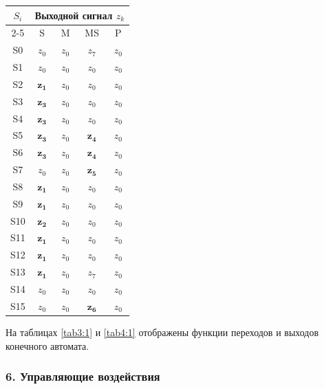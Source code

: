 \documentclass[11pt,a4paper,final]{article}
\begin{document}
	\begin{center}
		\label{tab4:1}
		\small
			\begin{tabular}{|c|c|c|c|c|}
			\hline
			\multirow{2}{*}{\( S_i \)} & \multicolumn{4}{c|}{Выходной сигнал \( z_k \)} \\
			\cline{2-5}
			& S & M & MS & P \\
			\hline
			S0 & \(z_0\) & \(z_0\) & \(z_7\) & \(z_0\) \\
			S1 & \(z_0\) & \(z_0\) & \(z_0\) & \(z_0\) \\
			S2 & \(\mathbf{z_1}\) & \(z_0\) & \(z_0\) & \(z_0\) \\
			S3 & \(\mathbf{z_3}\) & \(z_0\) & \(z_0\) & \(z_0\) \\
			S4 & \(\mathbf{z_3}\) & \(z_0\) & \(z_0\) & \(z_0\) \\
			S5 & \(\mathbf{z_3}\) & \(z_0\) & \(\mathbf{z_4}\) & \(z_0\) \\
			S6 & \(\mathbf{z_3}\) & \(z_0\) & \(\mathbf{z_4}\) & \(z_0\) \\
			S7 & \(z_0\) & \(z_0\) & \(\mathbf{z_5}\) & \(z_0\) \\
			S8 & \(\mathbf{z_1}\) & \(z_0\) & \(z_0\) & \(z_0\) \\
			S9 & \(\mathbf{z_1}\) & \(z_0\) & \(z_0\) & \(z_0\) \\
			S10 & \(\mathbf{z_2}\) & \(z_0\) & \(z_0\) & \(z_0\) \\
			S11 & \(\mathbf{z_1}\) & \(z_0\) & \(z_0\) & \(z_0\) \\
			S12 & \(\mathbf{z_1}\) & \(z_0\) & \(z_0\) & \(z_0\) \\
			S13 & \(\mathbf{z_1}\) & \(z_0\) & \(z_7\) & \(z_0\) \\
			S14 & \(z_0\) & \(z_0\) & \(z_0\) & \(z_0\) \\
			S15 & \(z_0\) & \(z_0\) & \(\mathbf{z_6}\) & \(z_0\) \\
			\hline
		\end{tabular}
	\end{center}
	
	На таблицах \ref{tab3:1} и \ref{tab4:1} отображены функции переходов и выходов конечного автомата.
	
	\subsubsection*{6. Управляющие воздействия}
		
\end{document}
